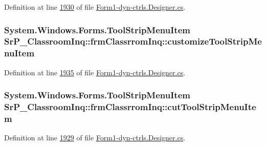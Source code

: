\-Definition at line \hyperlink{_form1-dyn-ctrls_8_designer_8cs_source_l01930}{1930} of file \hyperlink{_form1-dyn-ctrls_8_designer_8cs_source}{\-Form1-\/dyn-\/ctrls.\-Designer.\-cs}.

\hypertarget{class_sr_p___classroom_inq_1_1frm_classrrom_inq_a3296cc0b41841b3014df5c5759d9e839}{
\subsubsection[{customize\-Tool\-Strip\-Menu\-Item}]{\setlength{\rightskip}{0pt plus 5cm}\-System.\-Windows.\-Forms.\-Tool\-Strip\-Menu\-Item {\bf \-Sr\-P\-\_\-\-Classroom\-Inq\-::frm\-Classrrom\-Inq\-::customize\-Tool\-Strip\-Menu\-Item}}}
\label{class_sr_p___classroom_inq_1_1frm_classrrom_inq_a3296cc0b41841b3014df5c5759d9e839}


\-Definition at line \hyperlink{_form1-dyn-ctrls_8_designer_8cs_source_l01935}{1935} of file \hyperlink{_form1-dyn-ctrls_8_designer_8cs_source}{\-Form1-\/dyn-\/ctrls.\-Designer.\-cs}.

\hypertarget{class_sr_p___classroom_inq_1_1frm_classrrom_inq_a62b714f774f74f0e4a36f60909cf7d78}{
\subsubsection[{cut\-Tool\-Strip\-Menu\-Item}]{\setlength{\rightskip}{0pt plus 5cm}\-System.\-Windows.\-Forms.\-Tool\-Strip\-Menu\-Item {\bf \-Sr\-P\-\_\-\-Classroom\-Inq\-::frm\-Classrrom\-Inq\-::cut\-Tool\-Strip\-Menu\-Item}}}
\label{class_sr_p___classroom_inq_1_1frm_classrrom_inq_a62b714f774f74f0e4a36f60909cf7d78}


\-Definition at line \hyperlink{_form1-dyn-ctrls_8_designer_8cs_source_l01929}{1929} of file \hyperlink{_form1-dyn-ctrls_8_designer_8cs_source}{\-Form1-\/dyn-\/ctrls.\-Designer.\-cs}.

